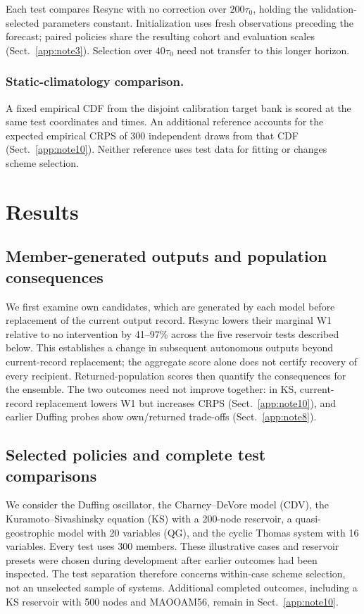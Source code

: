 \documentclass[gmd,manuscript]{copernicus}
\begin{document}
Each test compares Resync with no correction over $200\tau_0$, holding the validation-selected parameters constant. Initialization uses fresh observations preceding the forecast; paired policies share the resulting cohort and evaluation scales (Sect.~\ref{app:note3}). Selection over $40\tau_0$ need not transfer to this longer horizon.

\subsubsection{Static-climatology comparison.}
A fixed empirical CDF from the disjoint calibration target bank is scored at the same test coordinates and times. An additional reference accounts for the expected empirical CRPS of 300 independent draws from that CDF (Sect.~\ref{app:note10}). Neither reference uses test data for fitting or changes scheme selection.



\section{Results}

\subsection{Member-generated outputs and population consequences}
We first examine own candidates, which are generated by each model before replacement of the current output record. Resync lowers their marginal W1 relative to no intervention by 41--97\% across the five reservoir tests described below. This establishes a change in subsequent autonomous outputs beyond current-record replacement; the aggregate score alone does not certify recovery of every recipient. Returned-population scores then quantify the consequences for the ensemble. The two outcomes need not improve together: in KS, current-record replacement lowers W1 but increases CRPS (Sect.~\ref{app:note10}), and earlier Duffing probes show own/returned trade-offs (Sect.~\ref{app:note8}).

\subsection{Selected policies and complete test comparisons}
We consider the Duffing oscillator, the Charney--DeVore model (CDV), the Kuramoto--Sivashinsky equation (KS) with a 200-node reservoir, a quasi-geostrophic model with 20 variables (QG), and the cyclic Thomas system with 16 variables. Every test uses 300 members. These illustrative cases and reservoir presets were chosen during development after earlier outcomes had been inspected. The test separation therefore concerns within-case scheme selection, not an unselected sample of systems. Additional completed outcomes, including a KS reservoir with 500 nodes and MAOOAM56, remain in Sect.~\ref{app:note10}.
\end{document}
